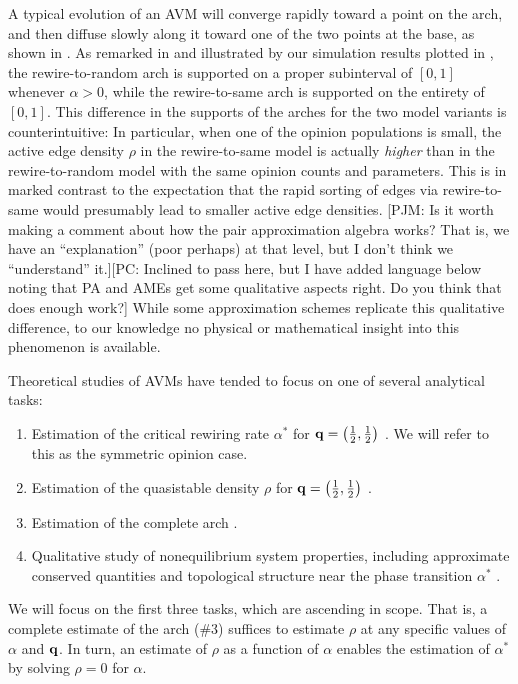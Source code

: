 \documentclass[review, onefignum, onetabnum]{siamart171218}
\newcommand{\pjm}[1]{{\color{blue}[PJM: #1]}}
\newcommand{\pc}[1]{{\color{comment_purple}[PC: #1]}}
\begin{document}
	A typical evolution of an AVM will converge rapidly toward a point on the arch, and then diffuse slowly along it toward one of the two points at the base, as shown in .
	As remarked in \cite{Durrett2012} and illustrated by our simulation results plotted in  , the rewire-to-random arch is supported on a proper subinterval of $[0,1]$ whenever $\alpha >0$, while the rewire-to-same arch is supported on the entirety of $[0,1]$. 
	This difference in the supports of the arches for the two model variants is counterintuitive: 
	In particular, when one of the opinion populations is small, the active edge density $\rho$ in the rewire-to-same model is actually \emph{higher} than in the rewire-to-random model with the same opinion counts and parameters.  
	This is in marked contrast to the expectation that the rapid sorting of edges via rewire-to-same would presumably lead to  smaller active edge densities. \pjm{Is it worth making a comment about how the pair approximation algebra works? That is, we have an ``explanation'' (poor perhaps) at that level, but I don't think we ``understand'' it.}\pc{Inclined to pass here, but I have added language below noting that PA and AMEs get some qualitative aspects right. Do you think that does enough work?}
	While some approximation schemes \cite{Durrett2012} replicate this qualitative difference, to our knowledge no physical or mathematical insight into this phenomenon is available. 
	
	Theoretical studies of AVMs have tended to focus on one of several analytical tasks:
	\begin{enumerate}
		\item Estimation of the critical rewiring rate $\alpha^*$ for $\mathbf{q} = \left(\frac{1}{2}, \frac{1}{2}\right)$ \cite{Bohme2011,Basu2015a}. We will refer to this as the symmetric opinion case. 
		\item Estimation of the quasistable density $\rho$ for $\mathbf{q} = \left(\frac{1}{2}, \frac{1}{2}\right)$ \cite{Demirel2012,Silk2014,Ji2013}. 
		\item Estimation of the complete arch \cite{Durrett2012,Shi2013}. 
		\item Qualitative study of nonequilibrium system properties, including approximate conserved quantities \cite{Toruniewska2017} and topological structure near the phase transition $\alpha^*$ \cite{Horstmeyer2018}.
	\end{enumerate}
	We will focus on the first three tasks, which are ascending in scope. 
	That is, a complete estimate of the arch (\#3) suffices to estimate $\rho$ at any specific values of $\alpha$ and $\mathbf{q}$. 
	In turn, an estimate of $\rho$ as a function of $\alpha$ enables the estimation of $\alpha^*$ by solving $\rho = 0$ for $\alpha$. 
	
\end{document}
